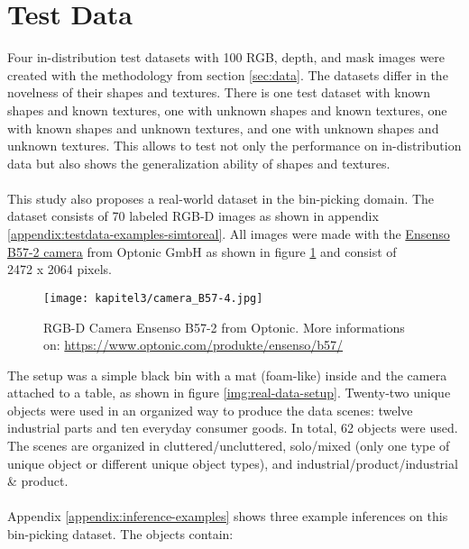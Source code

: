 	\section{Test Data}
	\label{sec:test-data}
		Four in-distribution test datasets with 100 RGB, depth, and mask images were created with the methodology from section \ref{sec:data}.
		The datasets differ in the novelness of their shapes and textures. There is one test dataset with known shapes and known textures, one with unknown shapes and known textures, one with known shapes and unknown textures, and one with unknown shapes and unknown textures. This allows to test not only the performance on in-distribution data but also shows the generalization ability of shapes and textures.\\
		\\
		This study also proposes a real-world dataset in the bin-picking domain. The dataset consists of 70 labeled RGB-D images as shown in appendix \ref{appendix:testdata-examples-simtoreal}. All images were made with the \href{https://www.optonic.com/produkte/ensenso/b57/}{Ensenso B57-2 camera} from Optonic GmbH \cite{optonic} as shown in figure \ref{img:camera} and consist of\\2472 x 2064 pixels.
		\begin{figure}[h]
			\centering
			\texttt{[image: kapitel3/camera\_B57-4.jpg]}
			\caption[RGB-D Camera Ensenso B57-2 from Optonic. More informations on: \url{https://www.optonic.com/produkte/ensenso/b57/}]{RGB-D Camera Ensenso B57-2 from Optonic. More informations on: \url{https://www.optonic.com/produkte/ensenso/b57/}}
			\label{img:camera}
		\end{figure}
		\FloatBarrier
		The setup was a simple black bin with a mat (foam-like) inside and the camera attached to a table, as shown in figure \ref{img:real-data-setup}.
		Twenty-two unique objects were used in an organized way to produce the data scenes: twelve industrial parts and ten everyday consumer goods. In total, 62 objects were used. The scenes are organized in cluttered/uncluttered, solo/mixed (only one type of unique object or different unique object types), and industrial/product/industrial \& product.\\
		\\
		Appendix \ref{appendix:inference-examples} shows three example inferences on this bin-picking dataset.
		\clearpage
		The objects contain:
